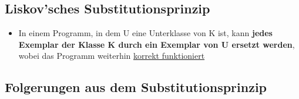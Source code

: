\documentclass[parskip=full, 12pt]{scrartcl}
\begin{document}
		\subsection{Liskov'sches Substitutionsprinzip}
		
			\begin{itemize}
				\item In einem Programm, in dem U eine Unterklasse von K ist, kann \textbf{jedes Exemplar der Klasse K durch ein Exemplar von U ersetzt werden}, wobei das Programm weiterhin \underline{korrekt funktioniert}
			\end{itemize}
		
		\newpage
		\subsection{Folgerungen aus dem Substitutionsprinzip}
		
\end{document}
